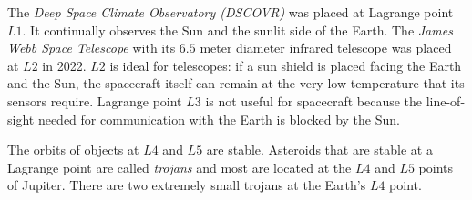 The \emph{Deep Space Climate Observatory (DSCOVR)} was placed at Lagrange point $L1$. It continually observes the Sun and the sunlit side of the Earth. The \emph{James Webb Space Telescope} with its $6.5$ meter diameter infrared telescope was placed at $L2$ in 2022.  $L2$ is ideal for telescopes: if a sun shield is placed facing the Earth and the Sun, the spacecraft itself can remain at the very low temperature that its sensors require. Lagrange point $L3$ is not useful for spacecraft because the line-of-sight needed for communication with the Earth is blocked by the Sun.

The orbits of objects at $L4$ and $L5$ are stable. Asteroids that are stable at a Lagrange point are called \emph{trojans} and most are located at the $L4$ and $L5$ points of Jupiter. There are two extremely small trojans at the Earth's $L4$ point.
